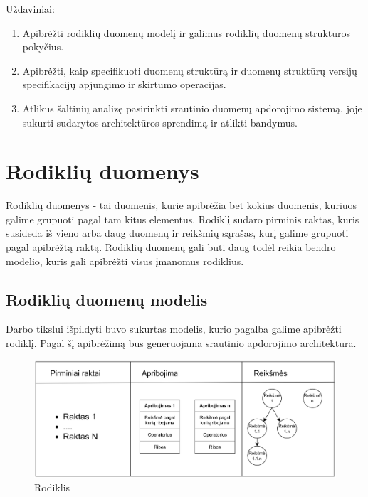 \documentclass{VUMIFPSbakalaurinis}
\begin{document}
Uždaviniai:
\begin{enumerate}
    \item Apibrėžti rodiklių duomenų modelį ir galimus rodiklių duomenų struktūros pokyčius.
    \item Apibrėžti, kaip specifikuoti duomenų struktūrą ir duomenų struktūrų versijų specifikacijų apjungimo ir skirtumo operacijas.
    \item Atlikus šaltinių analizę pasirinkti srautinio duomenų apdorojimo sistemą, joje sukurti sudarytos architektūros sprendimą ir atlikti bandymus.
\end{enumerate}

\section{Rodiklių duomenys}

Rodiklių duomenys - tai duomenis, kurie apibrėžia bet kokius duomenis, kuriuos galime grupuoti pagal tam kitus elementus. Rodiklį sudaro pirminis raktas, kuris susideda iš vieno arba daug duomenų ir reikšmių sąrašas, kurį galime grupuoti pagal apibrėžtą raktą.      
Rodiklių duomenų gali būti daug todėl reikia bendro modelio, kuris gali apibrėžti visus įmanomus rodiklius. 
\subsection{Rodiklių duomenų modelis}

Darbo tikslui išpildyti buvo sukurtas modelis, kurio pagalba galime apibrėžti rodiklį. Pagal šį apibrėžimą bus generuojama srautinio apdorojimo architektūra.

\begin{figure}[H]
    \centering
    \includegraphics[width=1\textwidth]{img/Rodiklis}
    \caption{Rodiklis}
    \label{img:rodiklis}
\end{figure}
\end{document}
